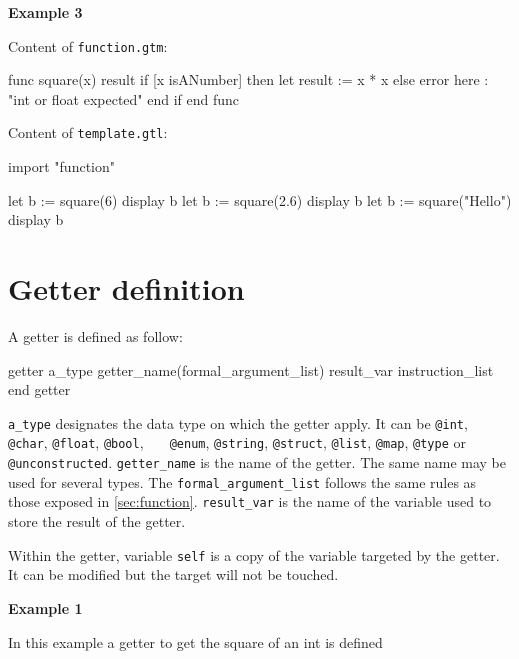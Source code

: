 \documentclass[10pt,openright,twosides,final]{memoir}
\newcommand{\gtltype}[1]{{\small\ttfamily #1}}
\newcommand{\gtlinline}[1]{\colorbox{light-blue}{\lstinline[language=gtl]{#1}}}
\newcommand{\examplen}[1]{\vspace{.75em}\noindent\textbf{Example #1}\vspace{0em}}
\begin{document}
\examplen{3}

\noindent Content of \texttt{\footnotesize function.gtm}:
\begin{gtl}
func square(x) result
  if [x isANumber] then
    let result := x * x
  else
    error here : "int or float expected"
  end if
end func
\end{gtl}
\noindent Content of \texttt{\footnotesize template.gtl}:
\begin{gtl}
import "function"

let b := square(6)
display b
let b := square(2.6)
display b
let b := square("Hello")
display b
\end{gtl}

\section{Getter definition}
\label{sec:getter}

A getter is defined as follow:

\begin{gtl}
getter a_type getter_name(formal_argument_list) result_var
  instruction_list
end getter
\end{gtl}

\gtlinline{a_type} designates the data type on which the getter apply. It can be \gtlinline{@int},  \gtlinline{@char}, \gtlinline{@float}, \gtlinline{@bool}, \gtlinline{	@enum}, \gtlinline{@string}, \gtlinline{@struct}, \gtlinline{@list}, \gtlinline{@map}, \gtlinline{@type} or \gtlinline{@unconstructed}. \gtlinline{getter_name} is the name of the getter. The same name may be used for several types. The \gtlinline{formal_argument_list} follows the same rules as those exposed in \ref{sec:function}. \gtlinline{result_var} is the name of the variable used to store the result of the getter.

Within the getter, variable \gtlinline{self} is a copy of the variable targeted by the getter. It can be modified but the target will not be touched.

\examplen{1}

In this example a getter to get the square of an \gtltype{int} is defined
\end{document}
